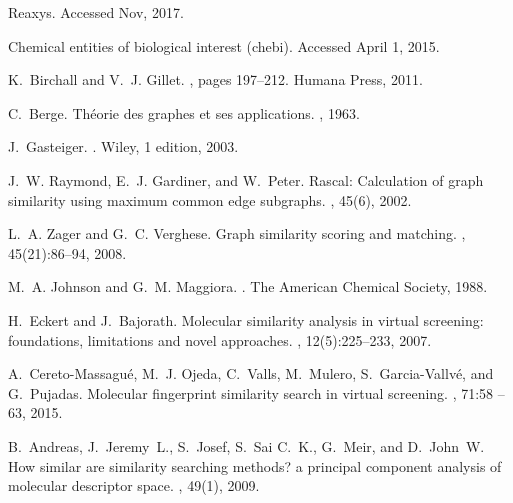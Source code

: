 \documentclass[10pt,letterpaper]{article}
\begin{document}
%
%
% 
\begin{thebibliography}{10}

Reaxys.
\newblock Accessed Nov, 2017.

Chemical entities of biological interest (chebi).
\newblock Accessed April 1, 2015.

K.~Birchall and V.~J. Gillet.
,
  pages 197--212.
\newblock Humana Press, 2011.

C.~Berge.
\newblock Th\'eorie des graphes et ses applications.
, 1963.

J.~Gasteiger.
.
\newblock Wiley, 1 edition, 2003.

J.~W. Raymond, E.~J. Gardiner, and W.~Peter.
\newblock Rascal: Calculation of graph similarity using maximum common edge
  subgraphs.
, 45(6), 2002.

L.~A. Zager and G.~C. Verghese.
\newblock Graph similarity scoring and matching.
, 45(21):86--94, 2008.

M.~A. Johnson and G.~M. Maggiora.
.
\newblock The American Chemical Society, 1988.

H.~Eckert and J.~Bajorath.
\newblock Molecular similarity analysis in virtual screening: foundations,
  limitations and novel approaches.
, 12(5):225--233, 2007.

A.~Cereto-Massagu\'e, M.~J. Ojeda, C.~Valls, M.~Mulero, S.~Garcia-Vallv\'e, and
  G.~Pujadas.
\newblock Molecular fingerprint similarity search in virtual screening.
, 71:58 -- 63, 2015.

B.~Andreas, J.~Jeremy~L., S.~Josef, S.~Sai C.~K., G.~Meir, and D.~John~W.
\newblock How similar are similarity searching methods? a principal component
  analysis of molecular descriptor space.
, 49(1), 2009.


\end{thebibliography}
\end{document}
